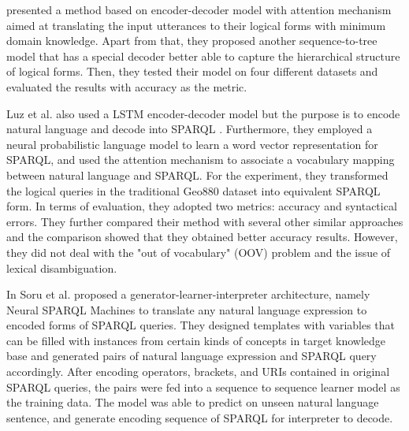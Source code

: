 \cite{dong2016language} presented a method based on encoder-decoder model with attention mechanism aimed at translating the input utterances to their logical forms with minimum domain knowledge. Apart from that, they proposed another sequence-to-tree model that has a special decoder better able to capture the hierarchical structure of logical forms. Then, they tested their model on four different datasets and evaluated the results with accuracy as the metric. 

Luz et al. also used a LSTM encoder-decoder model but the purpose is to encode natural language and decode into SPARQL \cite{Luz2018}. Furthermore, they employed a neural probabilistic language model to learn a word vector representation for SPARQL, and used the attention mechanism to associate a vocabulary mapping between natural language and SPARQL. For the experiment, they transformed the logical queries in the traditional Geo880 dataset into equivalent SPARQL form. In terms of evaluation, they adopted two metrics: accuracy and syntactical errors. They further compared their method with several other similar approaches \cite{alagha2015using} \cite{Kaufmann06querix:a} and the comparison showed that they obtained better accuracy results. However, they did not deal with the "out of vocabulary" (OOV) problem and the issue of lexical disambiguation.

In \cite{Soru2018a,Soru2018} Soru et al. proposed a generator-learner-interpreter architecture, namely Neural SPARQL Machines to translate any natural language expression to encoded forms of SPARQL queries. They designed templates with variables that can be filled with instances from certain kinds of concepts in target knowledge base and generated pairs of natural language expression and SPARQL query accordingly. After encoding operators, brackets, and URIs contained in original SPARQL queries, the pairs were fed into a sequence to sequence learner model as the training data. The model was able to predict on unseen natural language sentence, and generate encoding sequence of SPARQL for interpreter to decode. 